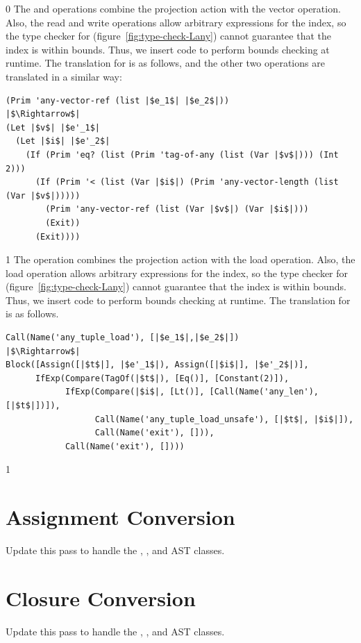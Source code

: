 \documentclass[7x10]{TimesAPriori_MIT}%
\def\racketEd{0}
\def\pythonEd{1}
\def\edition{1}
\newcommand{\pythonColor}[0]{}
\numberwithin{theorem}{chapter}
\numberwithin{definition}{chapter}
\numberwithin{equation}{chapter}
\begin{document}
{\if\edition\racketEd    
The  and  operations
combine the projection action with the vector operation.  Also, the
read and write operations allow arbitrary expressions for the index, so
the type checker for \LangAny{} (figure~\ref{fig:type-check-Lany})
cannot guarantee that the index is within bounds. Thus, we insert code
to perform bounds checking at runtime. The translation for
 is as follows, and the other two operations are
translated in a similar way:
\begin{center}
\begin{minipage}{0.95\textwidth}
\begin{lstlisting}
(Prim 'any-vector-ref (list |$e_1$| |$e_2$|))
|$\Rightarrow$|
(Let |$v$| |$e'_1$|
  (Let |$i$| |$e'_2$|
    (If (Prim 'eq? (list (Prim 'tag-of-any (list (Var |$v$|))) (Int 2)))
      (If (Prim '< (list (Var |$i$|) (Prim 'any-vector-length (list (Var |$v$|)))))
        (Prim 'any-vector-ref (list (Var |$v$|) (Var |$i$|)))
        (Exit))
      (Exit))))
\end{lstlisting}
\end{minipage}
\end{center}
\fi}
%
{\if\edition\pythonEd\pythonColor
%
The  operation combines the projection action
with the load operation.  Also, the load operation allows arbitrary
expressions for the index, so the type checker for \LangAny{}
(figure~\ref{fig:type-check-Lany}) cannot guarantee that the index is
within bounds. Thus, we insert code to perform bounds checking at
runtime. The translation for  is as follows.

\begin{lstlisting}
Call(Name('any_tuple_load'), [|$e_1$|,|$e_2$|])
|$\Rightarrow$|
Block([Assign([|$t$|], |$e'_1$|), Assign([|$i$|], |$e'_2$|)],
      IfExp(Compare(TagOf(|$t$|), [Eq()], [Constant(2)]),
            IfExp(Compare(|$i$|, [Lt()], [Call(Name('any_len'), [|$t$|])]),
                  Call(Name('any_tuple_load_unsafe'), [|$t$|, |$i$|]),
                  Call(Name('exit'), [])),
            Call(Name('exit'), [])))
\end{lstlisting}
\fi}


{\if\edition\pythonEd\pythonColor

\section{Assignment Conversion}
\label{sec:convert-assignments-Lany}

Update this pass to handle the , , and
 AST classes.

\section{Closure Conversion}
\label{sec:closure-conversion-Lany}

Update this pass to handle the , , and
 AST classes.

\fi}
\end{document}
